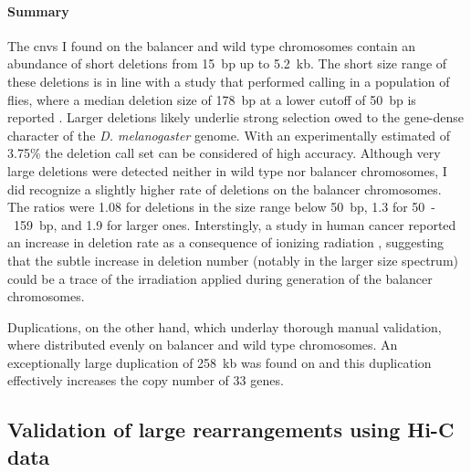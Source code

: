\paragraph{Summary} The \acp{cnv} I found on the balancer and wild type
chromosomes contain an abundance of short deletions from 15~bp up
to 5.2~kb. The short size range of these deletions is in line with a
study that performed \sv calling in a population of flies,
where a median deletion size of 178~bp at a lower cutoff of 50~bp is reported
\citep{Zichner2013}. Larger deletions likely underlie strong selection owed to
the gene-dense character of the \textit{D. melanogaster} genome.
With an experimentally estimated \fdr of 3.75\% the deletion call set can be
considered of high accuracy. Although very large deletions were
detected neither in wild type nor balancer chromosomes, I did recognize a slightly
higher rate of deletions on the balancer chromosomes. The ratios were 1.08 for
deletions in the size range below 50~bp, 1.3 for 50~-~159~bp, and 1.9 for larger
ones. Interstingly, a study in human cancer reported an increase in deletion
rate as a consequence of ionizing radiation \citep{Behjati2016}, suggesting that the
subtle increase in deletion number (notably in the larger size spectrum) could
be a trace of the irradiation applied during generation of the
balancer chromosomes.

Duplications, on the other hand, which underlay thorough manual validation,
where distributed evenly on balancer and wild type chromosomes. An exceptionally
large duplication of 258~kb was found on \cyo and this duplication effectively
increases the copy number of 33 genes.






\subsection{Validation of large rearrangements using Hi-C data}
\label{sec:balancer_hic_svs}


